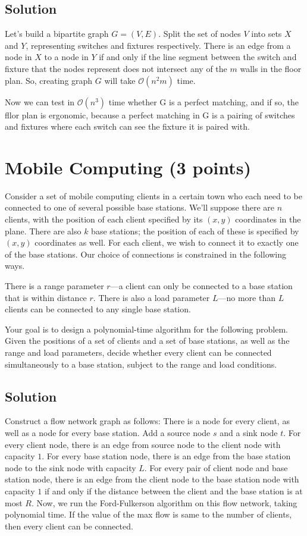 \documentclass[letter,11pt]{article}
\begin{document}
\subsection{Solution}

Let's build a bipartite graph $G = (V,E)$. Split the set of nodes $V$ into sets $X$ and $Y$, representing switches and fixtures respectively. There is an edge from a node in $X$ to a node in $Y$ if and only if the line segment between the switch and fixture that the nodes represent does not intersect any of the $m$ walls in the floor plan. So, creating graph $G$ will take $\mathcal{O}(n^2m)$ time.

Now we can test in $\mathcal{O}(n^3)$ time whether G is a perfect matching, and if so, the fllor plan is ergonomic, because a perfect matching in G is a pairing of switches and fixtures where each switch can see the fixture it is paired with.


\section{Mobile Computing (3 points)}

Consider a set of mobile computing clients in a certain town who each need to be connected to one of several possible base stations. We’ll suppose there are $n$ clients, with the position of each client specified by its $(x, y)$ coordinates in the plane. There are also $k$ base stations; the position of each of these is specified by $(x, y)$ coordinates as well. For each client, we wish to connect it to exactly one of the base stations. Our choice of connections is constrained in the following ways.


There is a range parameter $r$—a client can only be connected to a base station that is within distance $r$. There is also a load parameter $L$—no more than $L$ clients can be connected to any single base station.


Your goal is to design a polynomial-time algorithm for the following problem. Given the positions of a set of clients and a set of base stations, as well as the range and load parameters, decide whether every client can be connected simultaneously to a base station, subject to the range and
load conditions.

\subsection{Solution}

Construct a flow network graph as follows: There is a node for every client, as well as a node for every base station. Add a source node $s$ and a sink node $t$. For every client node, there is an edge from source node to the client node with capacity $1$. For every base station node, there is an edge from the base station node to the sink node with capacity $L$. For every pair of client node and base station node, there is an edge from the client node to the base station node with capacity $1$ if and only if the distance between the client and the base station is at most $R$. Now, we run the Ford-Fulkerson algorithm on this flow network, taking polynomial time. If the value of the max 
flow is same to the number of clients, then every client can be connected.
\end{document}
